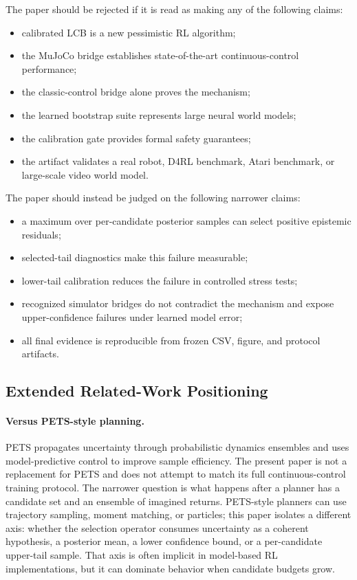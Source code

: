 \documentclass{article}
\begin{document}
The paper should be rejected if it is read as making any of the following
claims:
\begin{itemize}
    \item calibrated LCB is a new pessimistic RL algorithm;
    \item the MuJoCo bridge establishes state-of-the-art continuous-control
    performance;
    \item the classic-control bridge alone proves the mechanism;
    \item the learned bootstrap suite represents large neural world models;
    \item the calibration gate provides formal safety guarantees;
    \item the artifact validates a real robot, D4RL benchmark, Atari benchmark,
    or large-scale video world model.
\end{itemize}

The paper should instead be judged on the following narrower claims:
\begin{itemize}
    \item a maximum over per-candidate posterior samples can select positive
    epistemic residuals;
    \item selected-tail diagnostics make this failure measurable;
    \item lower-tail calibration reduces the failure in controlled stress
    tests;
    \item recognized simulator bridges do not contradict the mechanism and
    expose upper-confidence failures under learned model error;
    \item all final evidence is reproducible from frozen CSV, figure, and
    protocol artifacts.
\end{itemize}

\subsection{Extended Related-Work Positioning}

\paragraph{Versus PETS-style planning.}
PETS propagates uncertainty through probabilistic dynamics ensembles and uses
model-predictive control to improve sample efficiency. The present paper is not
a replacement for PETS and does not attempt to match its full continuous-control
training protocol. The narrower question is what happens after a planner has a
candidate set and an ensemble of imagined returns. PETS-style planners can use
trajectory sampling, moment matching, or particles; this paper isolates a
different axis: whether the selection operator consumes uncertainty as a
coherent hypothesis, a posterior mean, a lower confidence bound, or a
per-candidate upper-tail sample. That axis is often implicit in model-based RL
implementations, but it can dominate behavior when candidate budgets grow.
\end{document}
